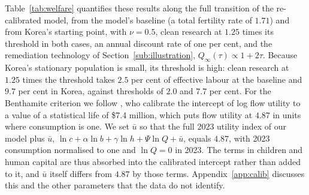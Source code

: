 \documentclass[11pt]{article}
\begin{document}
Table~\ref{tab:welfare} quantifies these results along the full transition of the re-calibrated model,
from the model's baseline (a total fertility rate of $1.71$) and from Korea's starting point, with
$\nu=0.5$, clean research at $1.25$ times its threshold in both cases, an annual discount rate of one per
cent, and the remediation technology of Section~\ref{sub:illustration}, $Q_\infty(\tau)\propto1+2\tau$.
Because Korea's stationary population is small, its threshold is high: clean research at $1.25$ times the
threshold takes $2.5$ per cent of effective labour at the baseline and $9.7$ per cent in Korea, against
thresholds of $2.0$ and $7.7$ per cent. For the Benthamite criterion we follow \citet{adhami2024}, who calibrate the intercept of log flow
utility to a value of a statistical life of \$7.4 million, which puts flow utility at $4.87$ in units
where consumption is one. We set $\bar u$ so that the full 2023 utility index of our model plus
$\bar u$, $\ln c+\alpha\ln b+\gamma\ln h+\Psi\ln Q+\bar u$, equals $4.87$, with 2023 consumption
normalised to one and $\ln Q=0$ in 2023. The terms in children and human capital are thus absorbed into
the calibrated intercept rather than added to it, and $\bar u$ itself differs from $4.87$ by those terms. Appendix~\ref{app:calib} discusses this and the
other parameters that the data do not identify.
\end{document}
